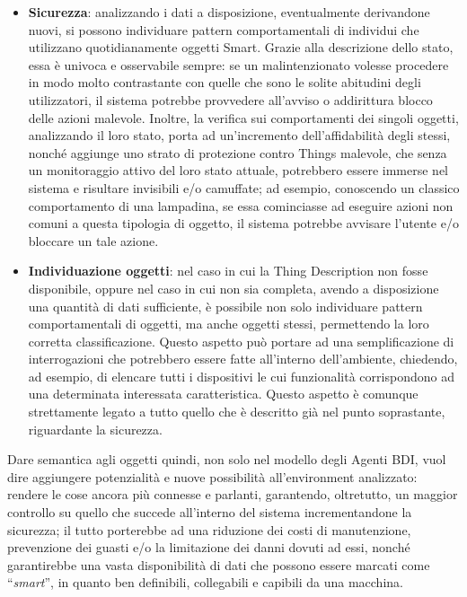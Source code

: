\documentclass[12pt,a4paper,openright,oneside]{report}
\newcommand{\quotes}[1]{``#1''}
\begin{document}
\begin{itemize}
	\item \textbf{Sicurezza}: analizzando i dati a disposizione, eventualmente derivandone nuovi, si possono individuare pattern comportamentali di individui che utilizzano quotidianamente oggetti Smart. Grazie alla descrizione dello stato, essa è univoca e osservabile sempre: se un malintenzionato volesse procedere in modo molto contrastante con quelle che sono le solite abitudini degli utilizzatori, il sistema potrebbe provvedere all'avviso o addirittura blocco delle azioni malevole. Inoltre, la verifica sui comportamenti dei singoli oggetti, analizzando il loro stato, porta ad un'incremento dell'affidabilità degli stessi, nonché aggiunge uno strato di protezione contro Things malevole, che senza un monitoraggio attivo del loro stato attuale, potrebbero essere immerse nel sistema e risultare invisibili e/o camuffate; ad esempio, conoscendo un classico comportamento di una lampadina, se essa cominciasse ad eseguire azioni non comuni a questa tipologia di oggetto, il sistema potrebbe avvisare l'utente e/o bloccare un tale azione.
	
	\item \textbf{Individuazione oggetti}: nel caso in cui la Thing Description non fosse disponibile, oppure nel caso in cui non sia completa, avendo a disposizione una quantità di dati sufficiente, è possibile non solo individuare pattern comportamentali di oggetti, ma anche oggetti stessi, permettendo la loro corretta classificazione. Questo aspetto può portare ad una semplificazione di interrogazioni che potrebbero essere fatte all'interno dell'ambiente, chiedendo, ad esempio, di elencare tutti i dispositivi le cui funzionalità corrispondono ad una determinata interessata caratteristica. Questo aspetto è comunque strettamente legato a tutto quello che è descritto già nel punto soprastante, riguardante la sicurezza.
	
\end{itemize}

Dare semantica agli oggetti quindi, non solo nel modello degli Agenti BDI, vuol dire aggiungere potenzialità e nuove possibilità all'environment analizzato: rendere le cose ancora più connesse e parlanti, garantendo, oltretutto, un maggior controllo su quello che succede all'interno del sistema incrementandone la sicurezza; il tutto porterebbe ad una riduzione dei costi di manutenzione, prevenzione dei guasti e/o la limitazione dei danni dovuti ad essi, nonché garantirebbe una vasta disponibilità di dati che possono essere marcati come \quotes{\textit{smart}}, in quanto ben definibili, collegabili e capibili da una macchina.\\
\end{document}
